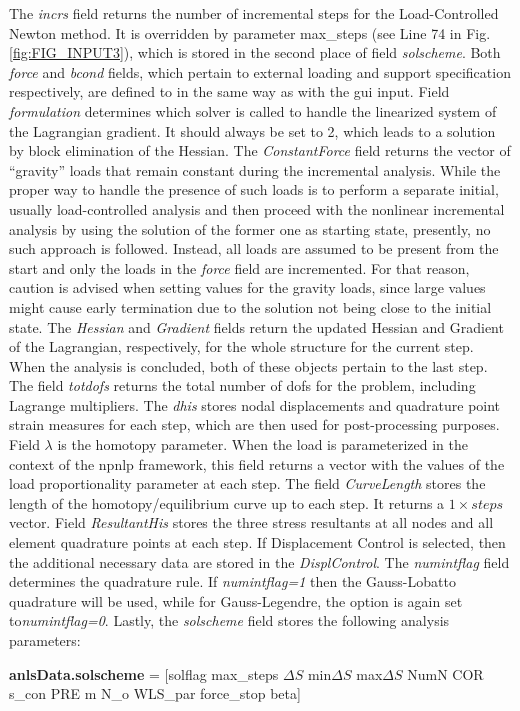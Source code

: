 \begin{appendices}
The \textit{incrs} field returns the number of incremental steps for the 
Load-Controlled Newton method. It is overridden by parameter max\_steps (see 
Line 74 in Fig. \ref{fig:FIG_INPUT3}), which is stored in the second place of 
field \textit{solscheme}. Both \textit{force} and \textit{bcond} fields, which 
pertain to external loading and support specification respectively, are defined 
to in the 
same way as with the \acrshort{gui} input. Field \textit{formulation} 
determines which solver is 
called to handle the linearized system of the Lagrangian gradient. It should 
always be set to 2, which leads to a solution by block elimination of the 
Hessian. The \textit{ConstantForce} field returns the vector of ``gravity'' 
loads that remain constant during the incremental analysis. While the proper 
way to handle the presence of such loads is to perform a separate initial, 
usually load-controlled analysis and then proceed with the nonlinear 
incremental analysis by using the solution of the former one as starting state, 
presently, no such approach is followed. Instead, all loads are assumed to be 
present from the start and only the loads in the \textit{force} field are 
incremented. For that reason, caution is advised when setting values for the 
gravity loads, since large values might cause early termination due to the 
solution not being close to the initial state. The \textit{Hessian} and 
\textit{Gradient} fields return the updated Hessian and Gradient of the 
Lagrangian, respectively, for the whole structure for the current step. When 
the analysis is concluded, both of these objects pertain to the last step. The 
field \textit{totdofs} returns the total number of \acrshort{dof}s for the 
problem, including Lagrange multipliers. The \textit{dhis} stores nodal 
displacements and quadrature point strain measures for each step, which are 
then used for post-processing purposes. Field $\lambda$ is the homotopy 
parameter. When the load is parameterized in the context of the 
\acrshort{npnlp} framework, this field returns a vector with the values of the 
load proportionality parameter at each step. The field \textit{CurveLength} 
stores the length of the homotopy/equilibrium curve up to each step. It returns 
a $1\times steps$ vector. Field \textit{ResultantHis} stores the three 
stress resultants at all nodes and all element quadrature points at each step. 
If Displacement Control is selected, then the additional necessary data are 
stored in the \textit{DisplControl}. The \textit{numintflag} field determines 
the quadrature rule. If \textit{numintflag=1} then the Gauss-Lobatto quadrature 
will be used, while for Gauss-Legendre, the option is again set 
to\textit{numintflag=0}. 
Lastly, the \textit{solscheme} field stores the following analysis parameters:
\begin{center}
	\textbf{anlsData.solscheme} = [solflag max\_steps $\Delta S$ 
	min$\Delta S$ max$\Delta S$ NumN COR s\_con PRE m N\_o 
	WLS\_par force\_stop beta]
\end{center}


\end{appendices}
